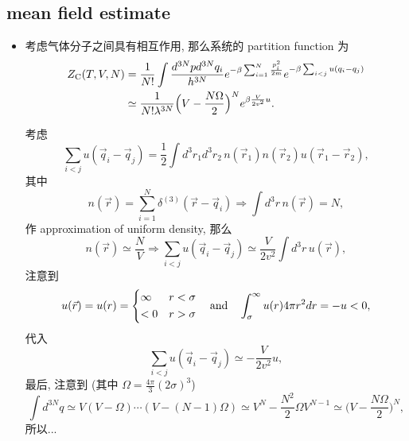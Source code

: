 \subsection{mean field estimate}
\begin{itemize}
	\item 考虑气体分子之间具有相互作用, 那么系统的 partition function 为
	\begin{align}
		Z_\text{C}(T, V, N) &= \frac{1}{N!} \int \frac{d^{3 N} p d^{3 N} q_i}{h^{3 N}} e^{- \beta \sum_{i = 1}^N \frac{p_i^2}{2 m}} e^{- \beta \sum_{i < j} u(q_i - q_j)} \notag \\
		&\simeq \frac{1}{N! \lambda^{3 N}} \Big( V - \frac{N \Omega}{2} \Big)^N e^{\beta \frac{V}{2 v^2} u}.
	\end{align}
	
	\begin{tcolorbox}[title=calculation:]
		考虑
		\begin{equation}
			\sum_{i < j} u(\vec{q}_i - \vec{q}_j) = \frac{1}{2} \int d^3 r_1 d^3 r_2 \, n(\vec{r}_1) n(\vec{r}_2) u(\vec{r}_1 - \vec{r}_2),
		\end{equation}
		其中
		\begin{equation}
			n(\vec{r}) = \sum_{i = 1}^N \delta^{(3)}(\vec{r} - \vec{q}_i) \Longrightarrow \int d^3 r \, n(\vec{r}) = N,
		\end{equation}
		作 approximation of uniform density, 那么
		\begin{equation}
			n(\vec{r}) \simeq \frac{N}{V} \Longrightarrow \sum_{i < j} u(\vec{q}_i - \vec{q}_j) \simeq \frac{V}{2 v^2} \int d^3 r \, u(\vec{r}),
		\end{equation}
		注意到
		\begin{equation}
			u(\vec{r}) = u(r) = \begin{dcases}
				\infty & r < \sigma \\
				< 0 & r > \sigma
			\end{dcases} \quad \text{and} \quad \int_\sigma^\infty u(r) 4 \pi r^2 dr = - u < 0,
		\end{equation}
		代入
		\begin{equation}
			\sum_{i < j} u(\vec{q}_i - \vec{q}_j) \simeq - \frac{V}{2 v^2} u,
		\end{equation}
		最后, 注意到 (其中 $\Omega = \frac{4 \pi}{3} (2 \sigma)^3$)
		\begin{equation}
			\int d^{3 N} q \simeq V (V - \Omega) \cdots (V - (N - 1) \Omega) \simeq V^N - \frac{N^2}{2} \Omega V^{N - 1} \simeq \Big( V - \frac{N \Omega}{2} \Big)^N,
		\end{equation}
		所以...
	\end{tcolorbox}
	

\end{itemize}

